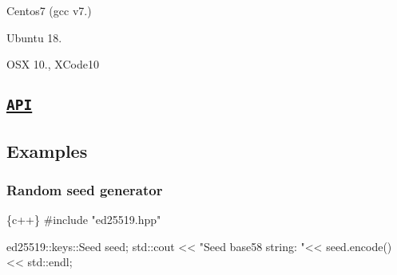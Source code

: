\begin{DoxyEnumerate}
\item Centos7 (gcc v7.)
\end{DoxyEnumerate}
\begin{DoxyEnumerate}
\item Ubuntu 18.
\end{DoxyEnumerate}
\begin{DoxyEnumerate}
\item O\+SX 10., X\+Code10
\end{DoxyEnumerate}

\subsection*{\href{https://github.com/dnevera/ed25519cpp/docs/html/namespaces.html}{\tt A\+PI}}

\subsection*{Examples}

\subsubsection*{Random seed generator}


\begin{DoxyCode}
\{c++\}
#include "ed25519.hpp"


ed25519::keys::Seed seed;
std::cout << "Seed base58 string: "<< seed.encode() << std::endl;
\end{DoxyCode}
 